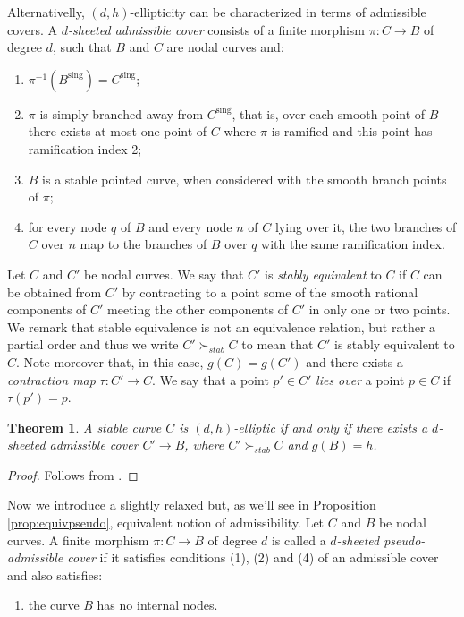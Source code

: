 \documentclass{article}
\newtheorem{theorem}{Theorem}
\newcommand{\steq}{\succ_{stab}}
\renewcommand{\:}{\colon }
\begin{document}
Alternativelly, $(d,h)$-ellipticity can be characterized in terms of admissible covers.
A \emph{$d$-sheeted admissible cover} consists of a finite morphism $\pi: C \rightarrow B$ of degree $d$, such that $B$ and $C$ are nodal curves and:
\begin{enumerate}
\item [$1.$] $\pi^{-1}(B^{\text{sing}})= C^{\text{sing}};$

\item[$2.$] $\pi$ is simply branched away  from $C^{\text{sing}}$, that is, over each smooth point of $B$ there exists at most one point of $C$ where $\pi$ is ramified and this point has ramification index 2;

\item[$3.$] $B$ is a stable pointed curve, when considered with the smooth branch points of $\pi$; 

\item [$4.$] for every node $q$ of $B$ and every node $n$ of $C$ lying over it, the two branches of $C$ over $n$ map to the branches of $B$ over $q$ with the same ramification index.
\end{enumerate}



Let $C$ and $C'$ be nodal curves. We say that $C'$ is \textit{stably equivalent} to $C$
if $C$ can be obtained from $C'$ by contracting to a point some of the smooth rational components of $C'$ meeting the other components of $C'$ in only one or two points. 
We remark that  stable equivalence is not an equivalence relation, but rather a partial order 
and thus we write $C'\steq C$ to mean that $C'$ is stably equivalent to $C$.
Note moreover that, in this case, %
$g(C)=g(C')$ and there exists a \emph{contraction map} $\tau:C' \rightarrow C$. 
We say that a point $p' \in C'$ \textit{lies over} a point $p \in C$ if $\tau(p')=p$.


\begin{theorem}\label{thm:mochi}
A stable curve $C$ is $(d,h)$-elliptic if and only if there exists a $d$-sheeted admissible cover ${C}'\rightarrow B$, where ${C}'\steq C$ %
and $g(B)=h$.
\end{theorem}
    \begin{proof}
Follows from  \cite{mochizuki}.        
    \end{proof}



Now we introduce a slightly relaxed but, as we'll see in Proposition \ref{prop:equivpseudo}, equivalent notion of admissibility. 
Let $C$ and $B$ be nodal curves. A finite morphism $\pi: C \rightarrow B$ of degree $d$ is called a \emph{$d$-sheeted pseudo-admissible cover} if it satisfies conditions (1), (2) and (4) of an admissible cover and also satisfies:
\begin{enumerate}
	\item [${3}'$.] the curve $B$  has no internal nodes.
\end{enumerate}
\end{document}
